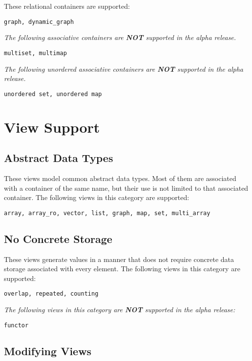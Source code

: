 \documentclass{report}
\begin{document}
\noindent
These relational containers are supported:

{\tt graph, dynamic\_graph }

\vspace{0.4cm}

\noindent
\textit{ The following associative containers are {\bf NOT} supported
in the alpha release.  }

{\tt multiset, multimap }

\noindent
\textit{ The following unordered associative containers are {\bf NOT} 
supported in the alpha release.  }

{\tt unordered set, unordered map }


\section{View Support}

\subsection{Abstract Data Types}

\noindent
These views model common abstract data types.
Most of them are associated with a container of the same name,
but their use is not limited to that associated container.
The following views in this category are supported:

{\tt array, array\_ro, vector, list, graph, map, set,
multi\_array }

\subsection{No Concrete Storage}

\noindent
These views generate values in a manner that does not
require concrete data storage associated with every element.
The following views in this category are supported:

{\tt overlap, repeated, counting }

\vspace{0.4cm}

\noindent
\textit{ The following views in this category are 
{\bf NOT} supported in the alpha release: }

{\tt functor }

\subsection{Modifying Views}
\end{document}
